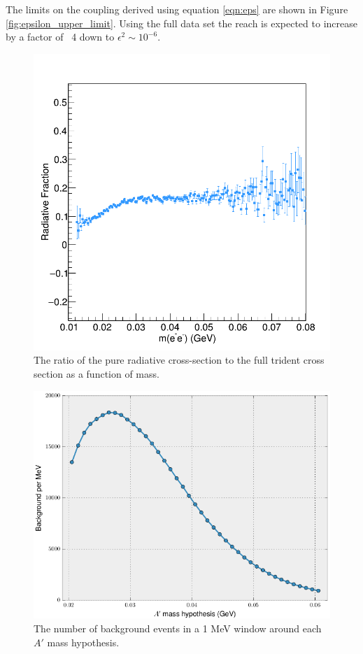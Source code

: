 The limits on the coupling derived using equation \ref{eqn:eps}
are shown in Figure \ref{fig:epsilon_upper_limit}. Using the full data set
the reach is expected to increase by a factor of ~4 down to $\epsilon^2 \sim 10^{-6}$.
\begin{figure}[ht]
    \centering
    \includegraphics[width=.8\textwidth]{images/rad_frac.png}
    \caption{The ratio of the pure radiative cross-section to the full trident 
             cross section as a function of mass.}
    \label{fig:rad_frac}
\end{figure}
\begin{figure}[hb]
    \centering
    \includegraphics[width=\textwidth]{images/bkg_mev.png}
    \caption{The number of background events in a 1 MeV window around each $A'$ mass hypothesis.}
    \label{fig:background_mev}
\end{figure}

